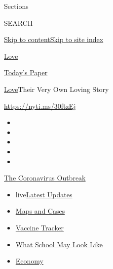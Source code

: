 Sections

SEARCH

\protect\hyperlink{site-content}{Skip to
content}\protect\hyperlink{site-index}{Skip to site index}

\href{https://www.nytimes3xbfgragh.onion/section/fashion/weddings}{Love}

\href{https://myaccount.nytimes3xbfgragh.onion/auth/login?response_type=cookie\&client_id=vi}{}

\href{https://www.nytimes3xbfgragh.onion/section/todayspaper}{Today's
Paper}

\href{/section/fashion/weddings}{Love}\textbar{}Their Very Own Loving
Story

\url{https://nyti.ms/30ftzEj}

\begin{itemize}
\item
\item
\item
\item
\item
\end{itemize}

\href{https://www.nytimes3xbfgragh.onion/news-event/coronavirus?action=click\&pgtype=Article\&state=default\&region=TOP_BANNER\&context=storylines_menu}{The
Coronavirus Outbreak}

\begin{itemize}
\tightlist
\item
  live\href{https://www.nytimes3xbfgragh.onion/2020/08/01/world/coronavirus-covid-19.html?action=click\&pgtype=Article\&state=default\&region=TOP_BANNER\&context=storylines_menu}{Latest
  Updates}
\item
  \href{https://www.nytimes3xbfgragh.onion/interactive/2020/us/coronavirus-us-cases.html?action=click\&pgtype=Article\&state=default\&region=TOP_BANNER\&context=storylines_menu}{Maps
  and Cases}
\item
  \href{https://www.nytimes3xbfgragh.onion/interactive/2020/science/coronavirus-vaccine-tracker.html?action=click\&pgtype=Article\&state=default\&region=TOP_BANNER\&context=storylines_menu}{Vaccine
  Tracker}
\item
  \href{https://www.nytimes3xbfgragh.onion/interactive/2020/07/29/us/schools-reopening-coronavirus.html?action=click\&pgtype=Article\&state=default\&region=TOP_BANNER\&context=storylines_menu}{What
  School May Look Like}
\item
  \href{https://www.nytimes3xbfgragh.onion/live/2020/07/31/business/stock-market-today-coronavirus?action=click\&pgtype=Article\&state=default\&region=TOP_BANNER\&context=storylines_menu}{Economy}
\end{itemize}

